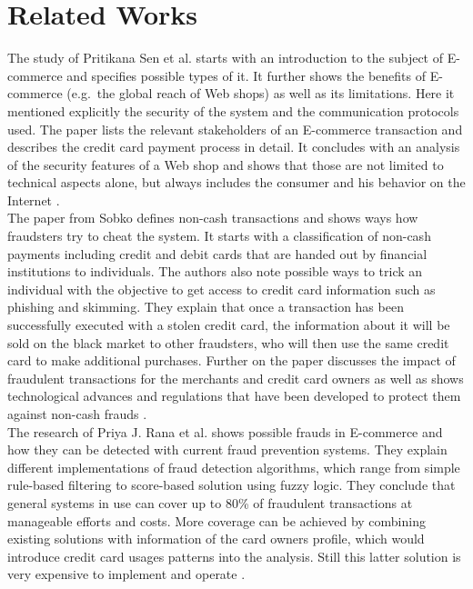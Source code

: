 
\chapter{Related Works}
\label{cha:related_works}

The study of Pritikana Sen et al. starts with an introduction to the subject of \gls{E-commerce} and specifies possible types of it. It further shows the benefits of \gls{E-commerce} (e.g.\ the global reach of Web shops) as well as its limitations. Here it mentioned explicitly the security of the system and the communication protocols used. The paper lists the relevant stakeholders of an \gls{E-commerce} transaction and describes the credit card payment process in detail. It concludes with an analysis of the security features of a Web shop and shows that those are not limited to technical aspects alone, but always includes the consumer and his behavior on the Internet \citep{sen2015study}. \\

The paper from Sobko defines non-cash transactions and shows ways how fraudsters try to cheat the system. It starts with a classification of non-cash payments including credit and debit cards that are handed out by financial institutions to individuals. The authors also note possible ways to trick an individual with the objective to get access to credit card information such as phishing and skimming. They explain that once a transaction has been successfully executed with a stolen credit card, the information about it will be sold on the black market to other fraudsters, who will then use the same credit card to make additional purchases. Further on the paper discusses the impact of fraudulent transactions for the merchants and credit card owners as well as shows technological advances and regulations that have been developed to protect them against non-cash frauds \citep{sobko2014fraud}. \\

The research of Priya J. Rana et al. shows possible frauds in \gls{E-commerce} and how they can be detected with current fraud prevention systems. They explain different implementations of fraud detection algorithms, which range from simple rule-based filtering to score-based solution using fuzzy logic. They conclude that general systems in use can cover up to 80\% of fraudulent transactions at manageable efforts and costs. More coverage can be achieved by combining existing solutions with information of the card owners profile, which would introduce credit card usages patterns into the analysis. Still this latter solution is very expensive to implement and operate \citep{rana2015survey}. \\


